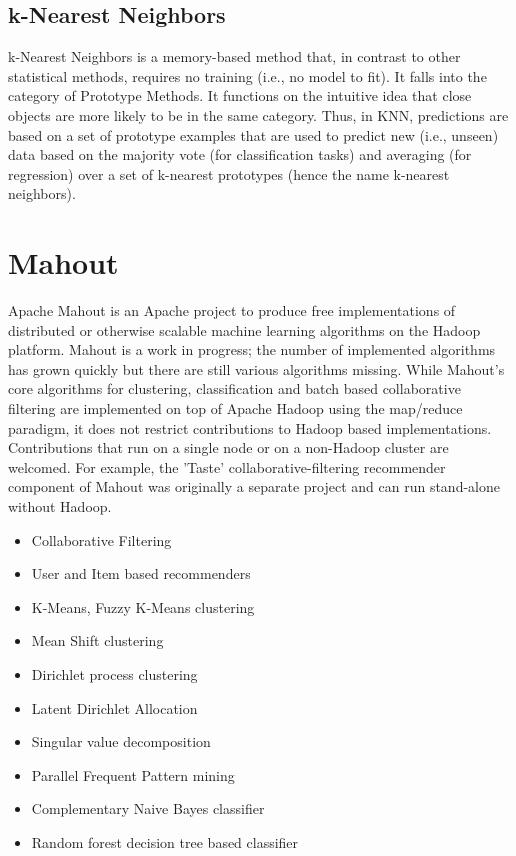 \subsection{k-Nearest Neighbors}

k-Nearest Neighbors is a memory-based method that, in contrast to other statistical methods, requires no training (i.e., no model to fit). It falls into the category of Prototype Methods. It functions on the intuitive idea that close objects are more likely to be in the same category. Thus, in KNN, predictions are based on a set of prototype examples that are used to predict new (i.e., unseen) data based on the majority vote (for classification tasks) and averaging (for regression) over a set of k-nearest prototypes (hence the name k-nearest neighbors).


\newpage
\section{Mahout}
Apache Mahout is an Apache project to produce free implementations of distributed or otherwise scalable machine learning algorithms on the Hadoop platform. Mahout is a work in progress; the number of implemented algorithms has grown quickly but there are still various algorithms missing.
While Mahout's core algorithms for clustering, classification and batch based collaborative filtering are implemented on top of Apache Hadoop using the map/reduce paradigm, it does not restrict contributions to Hadoop based implementations. Contributions that run on a single node or on a non-Hadoop cluster are  welcomed. For example, the 'Taste' collaborative-filtering recommender component of Mahout was originally a separate project and can run stand-alone without Hadoop. 
\begin{itemize}	
\item	Collaborative Filtering
\item	User and Item based recommenders
\item	K-Means, Fuzzy K-Means clustering
\item	Mean Shift clustering
\item	Dirichlet process clustering
\item	Latent Dirichlet Allocation
\item	Singular value decomposition
\item	Parallel Frequent Pattern mining
\item	Complementary Naive Bayes classifier
\item	Random forest decision tree based classifier
\end{itemize}	
